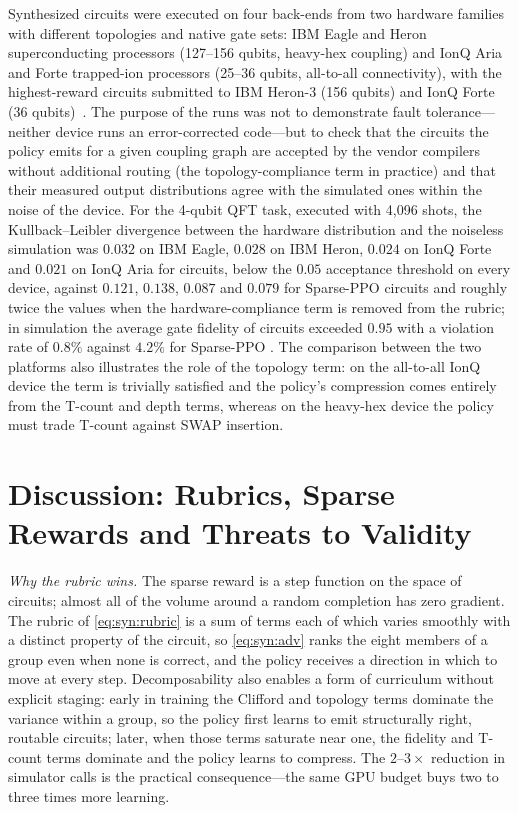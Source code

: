 Synthesized circuits were executed on four back-ends from two hardware families with different topologies and native gate sets: IBM Eagle and Heron superconducting processors (127--156 qubits, heavy-hex coupling) and IonQ Aria and Forte trapped-ion processors (25--36 qubits, all-to-all connectivity), with the highest-reward circuits submitted to IBM Heron-3 (156 qubits) and IonQ Forte (36 qubits)~\cite{guo2026rubriq}. The purpose of the runs was not to demonstrate fault tolerance---neither device runs an error-corrected code---but to check that the circuits the policy emits for a given coupling graph are accepted by the vendor compilers without additional routing (the topology-compliance term in practice) and that their measured output distributions agree with the simulated ones within the noise of the device. For the 4-qubit QFT task, executed with 4,096 shots, the Kullback--Leibler divergence between the hardware distribution and the noiseless simulation was $0.032$ on IBM Eagle, $0.028$ on IBM Heron, $0.024$ on IonQ Forte and $0.021$ on IonQ Aria for \rubriq{} circuits, below the $0.05$ acceptance threshold on every device, against $0.121$, $0.138$, $0.087$ and $0.079$ for Sparse-PPO circuits and roughly twice the \rubriq{} values when the hardware-compliance term is removed from the rubric; in simulation the average gate fidelity of \rubriq{} circuits exceeded $0.95$ with a violation rate of $0.8\%$ against $4.2\%$ for Sparse-PPO \cite{guo2026rubriq}. The comparison between the two platforms also illustrates the role of the topology term: on the all-to-all IonQ device the term is trivially satisfied and the policy's compression comes entirely from the T-count and depth terms, whereas on the heavy-hex device the policy must trade T-count against SWAP insertion.

\section{Discussion: Rubrics, Sparse Rewards and Threats to Validity}\label{sec:syn:rubriq-discussion}

\emph{Why the rubric wins.} The sparse reward is a step function on the space of circuits; almost all of the volume around a random completion has zero gradient. The rubric of \cref{eq:syn:rubric} is a sum of terms each of which varies smoothly with a distinct property of the circuit, so \cref{eq:syn:adv} ranks the eight members of a group even when none is correct, and the policy receives a direction in which to move at every step. Decomposability also enables a form of curriculum without explicit staging: early in training the Clifford and topology terms dominate the variance within a group, so the policy first learns to emit structurally right, routable circuits; later, when those terms saturate near one, the fidelity and T-count terms dominate and the policy learns to compress. The $2$--$3\times$ reduction in simulator calls is the practical consequence---the same GPU budget buys two to three times more learning.

